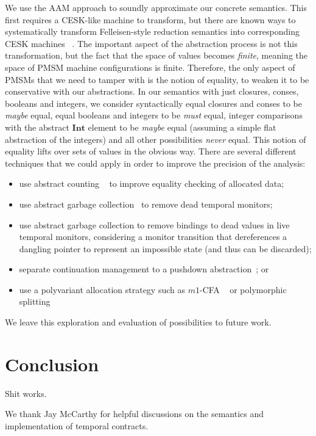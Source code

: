\documentclass[preprint,onecolumn,9pt]{sigplanconf} %
\begin{document}
We use the AAM approach to soundly approximate our concrete semantics.
%
This first requires a CESK-like machine to transform, but there are known ways to systematically transform Felleisen-style reduction semantics into corresponding CESK machines ~\citep{?}.
%
The important aspect of the abstraction process is not this transformation, but the fact that the space of values becomes \emph{finite}, meaning the space of PMSM machine configurations is finite.
%
Therefore, the only aspect of PMSMs that we need to tamper with is the notion of equality, to weaken it to be conservative with our abstractions.
%
In our semantics with just closures, conses, booleans and integers, we consider syntactically equal closures and conses to be \emph{maybe} equal, equal booleans and integers to be \emph{must} equal, integer comparisons with the abstract $\mathbf{Int}$ element to be \emph{maybe} equal (assuming a simple flat abstraction of the integers) and all other possibilities \emph{never} equal.
%
This notion of equality lifts over sets of values in the obvious way.
%
There are several different techniques that we could apply in order to improve the precision of the analysis:
\begin{itemize}
\item{use abstract counting ~\citep{dvanhorn:Might:2006:GammaCFA} to improve equality checking of allocated data;}
\item{use abstract garbage collection~\citep{dvanhorn:Might:2006:GammaCFA} to remove dead temporal monitors;}
\item{use abstract garbage collection to remove bindings to dead values in live temporal monitors, considering a monitor transition that dereferences a dangling pointer to represent an impossible state (and thus can be discarded);}
\item{separate continuation management to a pushdown abstraction~\citep{dvanhorn:Vardoulakis2011CFA2}; or}
\item{use a polyvariant allocation strategy such as $m1$-CFA ~\citep{dvanhorn:Might2010Resolving} or polymorphic splitting~\citep{dvanhorn:wright-jagannathan-toplas98}}
\end{itemize}
%
We leave this exploration and evaluation of possibilities to future work.
\section{Conclusion}

Shit works.

\acks We thank Jay McCarthy for helpful discussions on the semantics
and implementation of temporal contracts.
\end{document}
